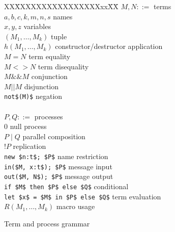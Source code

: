 \documentclass{book}
\newcommand{\nill}{0}
\begin{document}
\begin{figure}
\begin{center}
\begin{minipage}{\textwidth}
\begin{tabbing}
   XX\=XXXXXXXXXXXXXXXXxx\=XX\=\kill     %
$M,N ::=$ \>    			\> terms 					\\
\> $a,b,c,k,m,n,s$				\>\> names					\\
\> $x,y,z$						\>\> variables				\\
\> $(M_1,\dots,M_k)$				\>\> tuple					\\
\> $h(M_1,\dots,M_k)$				\>\> constructor/destructor application\\
\> $M = N$					\>\> term equality 			\\
\> $M \mathrel{<>} N$						\>\> term disequality 		\\
\> $M \mathrel{\&\&} M$                        \>\> conjunction			\\
\> $M \mathrel{||} M$                		\>\> disjunction			\\
\> \lstinline!not$(M)$!                       \>\> negation				\\
\\
$P,Q ::=$ \>				\> processes\\
\> $\nill$                 					\>   \> null process         	\\
\> $P \mid Q$              		 	\>   \> parallel composition  	\\
\> $!P$ 		          		 	\>   \> replication           	\\
\> \lstinline!new $n:t$; $P$! 	\>   \> name restriction   		\\
\> \lstinline!in($M, x:t$); $P$!\>   \> message input    		\\
\> \lstinline!out($M, N$); $P$!         		 	\>   \> message output    		\\
\> \lstinline!if $M$ then $P$ else $Q$!	\> 	 \> conditional				\\
\> \lstinline!let $x$ = $M$ in $P$ else $Q$!		\>	 \> term evaluation			\\
\> $R(M_1,\dots,M_k)$			 	\>	 \> macro usage
\end{tabbing}


\end{minipage}
\end{center}
\caption{Term and process grammar}
\label{fig:grammar}
\end{figure}
\end{document}
